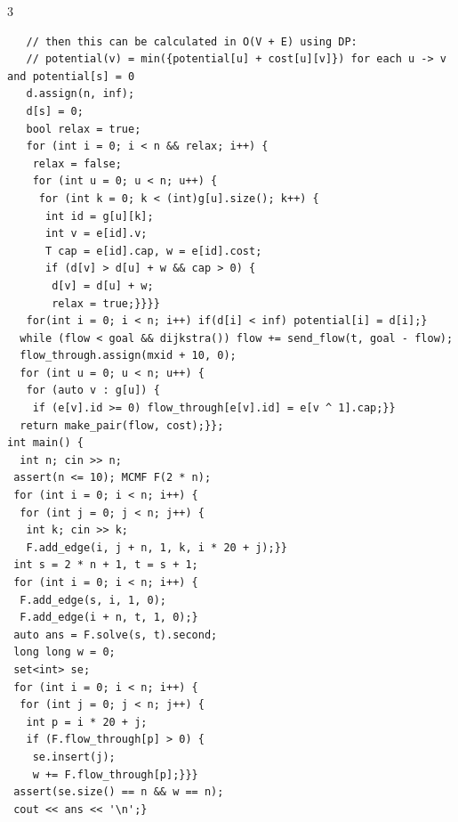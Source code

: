 \documentclass[8pt,a4paper,onesided]{article}
\begin{document}
\begin{multicols}{3}
\begin{verbatim}
   // then this can be calculated in O(V + E) using DP:
   // potential(v) = min({potential[u] + cost[u][v]}) for each u -> v and potential[s] = 0
   d.assign(n, inf);
   d[s] = 0;
   bool relax = true;
   for (int i = 0; i < n && relax; i++) {
    relax = false;
    for (int u = 0; u < n; u++) {
     for (int k = 0; k < (int)g[u].size(); k++) {
      int id = g[u][k];
      int v = e[id].v;
      T cap = e[id].cap, w = e[id].cost;
      if (d[v] > d[u] + w && cap > 0) {
       d[v] = d[u] + w;
       relax = true;}}}}
   for(int i = 0; i < n; i++) if(d[i] < inf) potential[i] = d[i];}
  while (flow < goal && dijkstra()) flow += send_flow(t, goal - flow);
  flow_through.assign(mxid + 10, 0);
  for (int u = 0; u < n; u++) {
   for (auto v : g[u]) {
    if (e[v].id >= 0) flow_through[e[v].id] = e[v ^ 1].cap;}}
  return make_pair(flow, cost);}};
int main() {
  int n; cin >> n;
 assert(n <= 10); MCMF F(2 * n);
 for (int i = 0; i < n; i++) {
  for (int j = 0; j < n; j++) {
   int k; cin >> k;
   F.add_edge(i, j + n, 1, k, i * 20 + j);}}
 int s = 2 * n + 1, t = s + 1;
 for (int i = 0; i < n; i++) {
  F.add_edge(s, i, 1, 0);
  F.add_edge(i + n, t, 1, 0);}
 auto ans = F.solve(s, t).second;
 long long w = 0;
 set<int> se;
 for (int i = 0; i < n; i++) {
  for (int j = 0; j < n; j++) {
   int p = i * 20 + j;
   if (F.flow_through[p] > 0) {
    se.insert(j);
    w += F.flow_through[p];}}}
 assert(se.size() == n && w == n);
 cout << ans << '\n';}
\end{verbatim}

\end{multicols}
\end{document}
